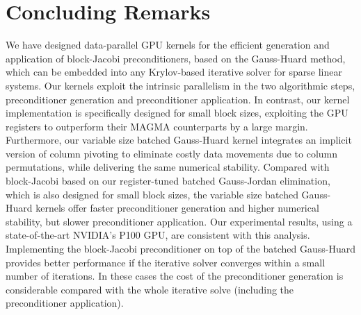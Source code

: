 \section{Concluding Remarks}
\label{2017-gh-block-jacobi:sec:s5-summary}


We have designed data-parallel GPU kernels for the efficient generation and application of 
block-Jacobi preconditioners, based on the Gauss-Huard method, which can be embedded into 
any Krylov-based iterative solver for sparse linear systems.
Our kernels exploit the intrinsic parallelism in the two algorithmic steps, 
preconditioner generation and preconditioner application.
In contrast, our kernel implementation is specifically designed
for small block sizes, exploiting the GPU registers to outperform their MAGMA counterparts by a large margin. 
Furthermore, our variable size batched Gauss-Huard kernel integrates an implicit version of column pivoting 
to eliminate costly data movements due to column permutations, 
while delivering the same numerical stability.
Compared with block-Jacobi based on our register-tuned batched Gauss-Jordan elimination,
which is also designed for small block sizes, the variable size batched Gauss-Huard kernels offer 
faster preconditioner generation and higher numerical stability, but slower
preconditioner application.
Our experimental results, using a state-of-the-art NVIDIA's P100 GPU, are consistent with this analysis.
Implementing the block-Jacobi preconditioner on top of the batched Gauss-Huard provides
better performance if the iterative solver converges within a small number of iterations.
In these cases the cost of the preconditioner generation is considerable compared with the 
whole iterative solve (including the preconditioner application).
